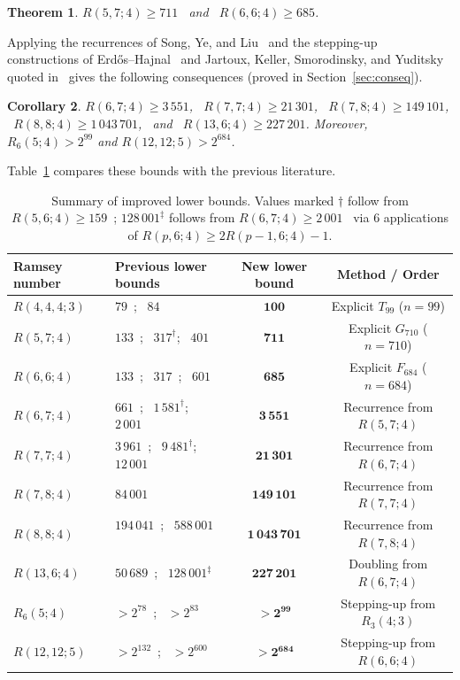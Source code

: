 \documentclass[11pt]{article}
\newtheorem{theorem}{Theorem}
\newtheorem{corollary}[theorem]{Corollary}
\theoremstyle{remark}
\begin{document}
\begin{theorem}\label{thm:four}
$R(5,7;4)\ge 711$ \ and \ $R(6,6;4)\ge 685$.
\end{theorem}

Applying the recurrences of Song, Ye, and Liu~\cite{sonyl} and the stepping-up
constructions of Erd\H{o}s--Hajnal~\cite{grs} and Jartoux, Keller, Smorodinsky,
and Yuditsky~\cite{jaksy} quoted in~\cite[Sections~7.1 and~7.5]{survey} gives
the following consequences (proved in Section~\ref{sec:conseq}).

\begin{corollary}\label{cor:rec}
$R(6,7;4)\ge 3\,551$, \ $R(7,7;4)\ge 21\,301$, \ $R(7,8;4)\ge 149\,101$, \
$R(8,8;4)\ge 1\,043\,701$, \ and \ $R(13,6;4)\ge 227\,201$. Moreover,
$R_6(5;4)>2^{99}$ and $R(12,12;5)>2^{684}$.
\end{corollary}

Table~\ref{tab:summary} compares these bounds with the previous literature.

\begin{table}[ht]
\centering
\small
\begin{tabular}{llcc}
\toprule
Ramsey number & Previous lower bounds & New lower bound & Method / Order\\
\midrule
$R(4,4,4;3)$ & $79$~\cite{survey,dyb3}; \ $84$~\cite{yang} & $\mathbf{100}$ & Explicit $T_{99}$ ($n=99$)\\
$R(5,7;4)$ & $133$~\cite{survey}; \ $317^{\dagger}$; \ $401$~\cite{lysenstoen} & $\mathbf{711}$ & Explicit $G_{710}$ ($n=710$)\\
$R(6,6;4)$ & $133$~\cite{survey}; \ $317$~\cite{ozdemir}; \ $601$~\cite{lysenstoen} & $\mathbf{685}$ & Explicit $F_{684}$ ($n=684$)\\
\midrule
$R(6,7;4)$ & $661$~\cite{survey}; \ $1\,581^{\dagger}$; \ $2\,001$~\cite{lysenstoen} & $\mathbf{3\,551}$ & Recurrence from $R(5,7;4)$\\
$R(7,7;4)$ & $3\,961$~\cite{survey}; \ $9\,481^{\dagger}$; \ $12\,001$~\cite{lysenstoen} & $\mathbf{21\,301}$ & Recurrence from $R(6,7;4)$\\
$R(7,8;4)$ & $84\,001$~\cite{lysenstoen} & $\mathbf{149\,101}$ & Recurrence from $R(7,7;4)$\\
$R(8,8;4)$ & $194\,041$~\cite{survey}; \ $588\,001$~\cite{lysenstoen} & $\mathbf{1\,043\,701}$ & Recurrence from $R(7,8;4)$\\
$R(13,6;4)$ & $50\,689$~\cite{survey,liu}; \ $128\,001^{\ddagger}$ & $\mathbf{227\,201}$ & Doubling from $R(6,7;4)$\\
$R_6(5;4)$ & $>2^{78}$~\cite{survey,jaksy}; \ $>2^{83}$~\cite{yang,jaksy} & $\mathbf{>2^{99}}$ & Stepping-up from $R_3(4;3)$\\
$R(12,12;5)$ & $>2^{132}$~\cite{survey,grs}; \ $>2^{600}$~\cite{lysenstoen,grs} & $\mathbf{>2^{684}}$ & Stepping-up from $R(6,6;4)$\\
\bottomrule
\end{tabular}
\caption{Summary of improved lower bounds. Values marked $\dagger$ follow from
$R(5,6;4)\ge 159$~\cite{ozdemir}; $128\,001^{\ddagger}$ follows from
$R(6,7;4)\ge 2\,001$~\cite{lysenstoen} via $6$ applications of
$R(p,6;4)\ge 2R(p-1,6;4)-1$.}
\label{tab:summary}
\end{table}
\end{document}
